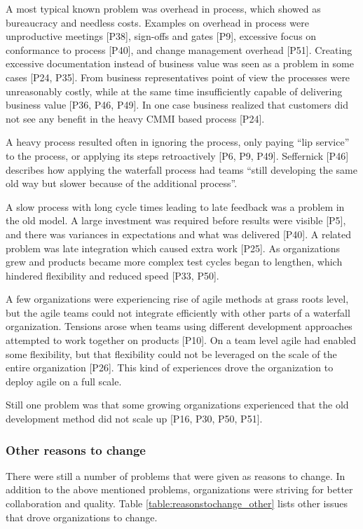 \documentclass[preprint,authoryear,12pt]{elsarticle}
\begin{document}
A most typical known problem was overhead in process, which showed as bureaucracy and
needless costs. Examples on overhead in process were unproductive meetings
[P38], sign-offs and gates [P9], excessive focus on conformance to process
[P40], and change management overhead [P51]. Creating excessive documentation
instead of business value was seen as a problem in some cases [P24, P35]. From
business representatives point of view the processes were unreasonably costly,
while at the same time insufficiently capable of delivering business value [P36,
P46, P49]. In one case business realized that customers did not see any benefit
in the heavy CMMI based process [P24].

A heavy process resulted often in ignoring the process, only paying ``lip
service'' to the process, or applying its steps retroactively [P6, P9, P49].
Seffernick [P46] describes how applying the waterfall process had teams ``still
developing the same old way but slower because of the additional process''.

A slow process with long cycle times leading to late feedback was a problem in
the old model. A large investment was required before results were visible [P5],
and there was variances in expectations and what was delivered [P40]. A related
problem was late integration which caused extra work [P25]. As organizations
grew and products became more complex test cycles began to lengthen, which
hindered flexibility and reduced speed [P33, P50].

A few organizations were experiencing rise of agile methods at grass roots
level, but the agile teams could not integrate efficiently with other parts of
a waterfall organization. Tensions arose when teams using different development
approaches attempted to work together on products [P10]. On a team level agile
had enabled some flexibility, but that flexibility could not be leveraged on the
scale of the entire organization [P26].
This kind of experiences drove the organization to deploy agile on a full scale.

Still one problem was that some growing organizations experienced that the old
development method did not scale up [P16, P30, P50, P51].


\subsubsection{Other reasons to change}

There were still a number of problems that were given as reasons to change.
In addition to the above mentioned problems, organizations were striving for
better collaboration and quality. Table \ref{table:reasonstochange_other} lists
other issues that drove organizations to change.
\end{document}
